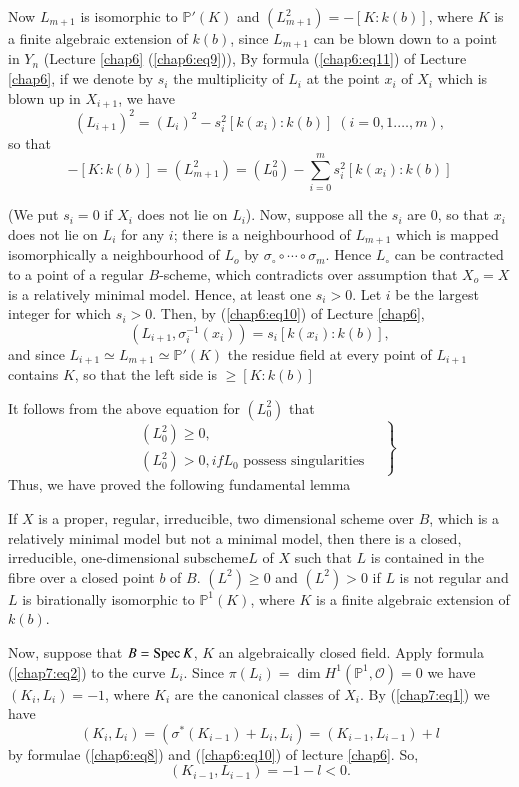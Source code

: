 Now $L_{m+1}$ is isomorphic to $\mathbb{P}'(K)$ and
$(L_{m+1}^2)=-[K:k(b)]$, where $K$ is a finite algebraic extension of
$k(b)$, since $L_{m+1}$ can be blown down to a point in $Y_n$ (Lecture
\ref{chap6} (\ref{chap6:eq9})), By formula (\ref{chap6:eq11}) of
Lecture \ref{chap6}, if 
we denote by $s_i$ the 
multiplicity of $L_i$ at the point $x_i$ of $X_i$ which is blown up in
$X_{i+1}$, we have 
$$
  (L_{i+1})^2=(L_i)^2-s_i^2[k(x_i):k(b)] \; (i=0,1.\ldots,m),
$$\pageoriginale
so that
$$
-[K:k(b)]=(L_{m+1}^2)=(L_0^2)-\sum_{i=0}^{m}s_i^2[k(x_i):k(b)]
$$

(We put $s_i=0$ if $X_i$ does not lie on $L_i$). Now, suppose all the
$s_i$ are $0$, so that $x_i$ does not lie on $L_i$ for any $i$; there
is a neighbourhood of $L_{m+1}$ which is mapped isomorphically a
neighbourhood of $L_o$ by $\sigma_\circ \circ \cdots \circ
\sigma_m$. Hence $L_\circ$ 
can be contracted to a point of a regular $B$-scheme, which
contradicts over assumption that $X_o=X$ is a relatively minimal
model. Hence, at least one $s_i>0$. Let $i$ be the largest integer for
which $s_i>0$. Then, by (\ref{chap6:eq10}) of Lecture \ref{chap6}, 
$$
(L_{i+1},\sigma_i^{-1}(x_i))=s_i[k(x_i):k(b)],
$$
and since $L_{i+1}\simeq L_{m+1} \simeq \mathbb{P}'(K)$ the residue field at
every point of $L_{i+1}$ contains $K$, so that the left side is $\geq
[K: k(b)]$ 

It follows from the above equation for $(L_0^2)$ that 
\begin{equation*}
  \left.
  \begin{aligned}
    &(L_0^2)\geq 0,\\
    &(L_0^2)>0, if L_0 \text{ possess singularities}
  \end{aligned}\quad 
  \right\}\tag{3}\label{chap7:eq3}
\end{equation*}
Thus, we have proved the following fundamental lemma

\begin{lemma*}
  If $X$ is a proper, regular, irreducible, two dimensional
    scheme over $B$, which is a relatively minimal model but not a
    minimal model, then there is a closed, irreducible,
    one-dimensional subscheme\pageoriginale $L$ of $X$ such that $L$
    is contained in 
    the fibre over a closed point $b$ of $B$. $(L^2)\geq 0$ and
    $(L^2)>0$ if $L$ is not regular and $L$ is birationally isomorphic
    to $\mathbb{P}^1(K)$, where $K$ is a finite algebraic extension of
    $k(b)$. 
\end{lemma*}

Now, suppose that $B= \operatorname{Spec} K$, $K$ an algebraically closed field. Apply
formula (\ref{chap7:eq2}) to the curve $L_i$. Since $\pi(L_i)=\dim
H^1(\mathbb{P}^1,\mathscr{O})=0$ we have $(K_i, L_i)=-1$, where $K_i$
are the canonical classes of $X_i$. By (\ref{chap7:eq1}) we have 
$$
(K_i,L_i)=(\sigma^*(K_{i-1})+L_i,L_i)=(K_{i-1},L_{i-1})+l
$$ 
by formulae (\ref{chap6:eq8}) and (\ref{chap6:eq10}) of lecture
\ref{chap6}. So, 
$$
(K_{i-1},L_{i-1})=-1-l<0.
$$

